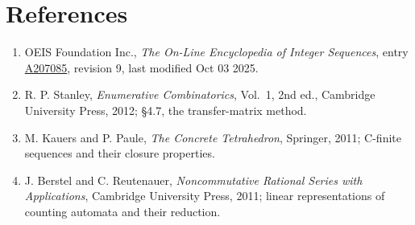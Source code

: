 \documentclass[11pt]{article}
\theoremstyle{definition}
\begin{document}
\section{References}

\begin{enumerate}

\item OEIS Foundation Inc., \emph{The On-Line Encyclopedia of Integer Sequences}, entry \href{https://oeis.org/A207085}{A207085}, revision 9, last modified Oct 03 2025.

\item R. P. Stanley, \emph{Enumerative Combinatorics}, Vol.~1, 2nd ed., Cambridge University Press, 2012; \S4.7, the transfer-matrix method.

\item M. Kauers and P. Paule, \emph{The Concrete Tetrahedron}, Springer, 2011; C-finite sequences and their closure properties.

\item J. Berstel and C. Reutenauer, \emph{Noncommutative Rational Series with Applications}, Cambridge University Press, 2011; linear representations of counting automata and their reduction.

\end{enumerate}
\end{document}
